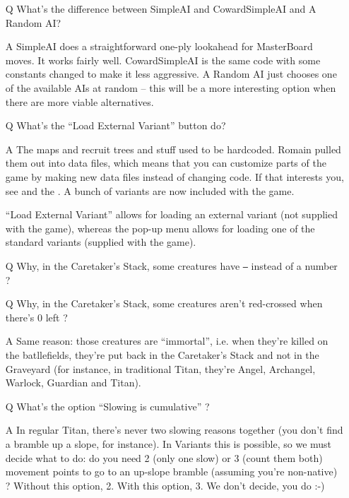 \documentclass{article}
\begin{document}
\begin{itemize}
\item[Q] What's the difference between SimpleAI and CowardSimpleAI and
 A Random AI?

\item[A] SimpleAI does a straightforward one-ply lookahead for MasterBoard
 moves. It works fairly well.  CowardSimpleAI is the same code with some
 constants changed to make it less aggressive.  A Random AI just chooses one
 of the available AIs at random -- this will be a more interesting option
 when there are more viable alternatives.


\item[Q] What's the ``Load External Variant'' button do? 

\item[A] The maps and recruit trees and stuff used to be hardcoded. Romain
 pulled them out into data files, which means that you can customize parts 
 of the game by making new data files instead of changing code. If that 
 interests you, see
 and the
 .
 A bunch of variants are now included with the game.

 ``Load External Variant'' allows for loading an external variant
 (not supplied with the game), whereas the pop-up menu allows
 for loading one of the standard variants (supplied with the game).

\item[Q] Why, in the Caretaker's Stack, some creatures have \texttt{--}
 instead of a number ?
\item[Q] Why, in the Caretaker's Stack, some creatures aren't red-crossed
 when there's 0 left ?

\item[A] Same reason: those creatures are ``immortal'', i.e. when they're
 killed on the batllefields, they're put back in the Caretaker's Stack
 and not in the Graveyard (for instance, in traditional Titan, they're
 Angel, Archangel, Warlock, Guardian and Titan).

\item[Q] What's the option ``Slowing is cumulative'' ?

\item[A] In regular Titan, there's never two slowing reasons together
(you don't find a bramble up a slope, for instance). In Variants this is
possible, so we must decide what to do: do you need 2 (only one slow) or 3 (count them both) movement points to go to an up-slope bramble (assuming you're
non-native) ? Without this option, 2. With this option, 3. We don't decide,
you do :-)


\end{itemize}
\end{document}
